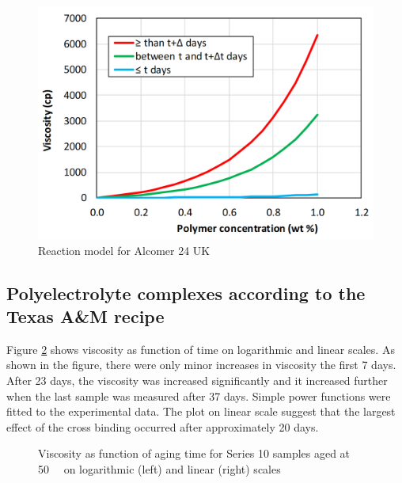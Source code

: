 \begin{figure}
    \centering
    \includegraphics[width=.75\textwidth]{img/cht/viscPolcModel.png}
    \caption{Reaction model for Alcomer 24 UK}
    \label{cht:viscPolcModel}
\end{figure}




\subsection{Polyelectrolyte complexes according to the Texas A\&M recipe}

 Figure \ref{cht:s10visc50} shows viscosity as function of time on logarithmic and linear scales. As shown in the figure, there were only minor increases in viscosity the first 7 days. After 23 days, the viscosity was increased significantly and it increased further when the last sample was measured after 37 days. Simple power functions were fitted to the experimental data. The plot on linear scale suggest that the largest effect of the cross binding occurred after approximately 20 days. 

\begin{figure}
    \centering
    \caption{Viscosity as function of aging time for Series 10 samples aged at 50~\celsius~ on logarithmic (left) and linear (right) scales}
    \label{cht:s10visc50}
\end{figure}

